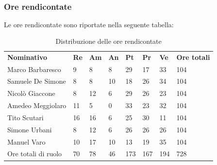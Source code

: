\subsubsection{Ore rendicontate}
Le ore rendicontate sono riportate nella seguente tabella:
\begin{center}
    \begin{table}[ht!]
        \centering
        \caption{Distribuzione delle ore rendicontate}
        \vspace{5px}
        \renewcommand{\arraystretch}{1.8}
        \begin{tabular}{p{100px} p{20px} p{20px} p{20px} p{20px} p{20px} p{20px} p{50px} }
            \rowcolor{logo!70} \textbf{Nominativo} & \textbf{Re} & \textbf{Am} & \textbf{An} & \textbf{Pt} & \textbf{Pr} & \textbf{Ve} & \textbf{Ore totali} \\
            Marco Barbaresco                       & 9           & 8           & 8           & 29          & 17          & 33          & 104                 \\
            Samuele De Simone                      & 8           & 8           & 10          & 18          & 26          & 34          & 104                 \\
            Nicolò Giaccone                        & 8           & 12          & 6           & 29          & 26          & 23          & 104                 \\
            Amedeo Meggiolaro                      & 11          & 5           & 0           & 33          & 23          & 32          & 104                 \\
            Tito Scutari                           & 16          & 16          & 6           & 25          & 30          & 11          & 104                 \\
            Simone Urbani                          & 8           & 12          & 6           & 26          & 26          & 26          & 104                 \\
            Manuel Varo                            & 10          & 17          & 10          & 13          & 19          & 35          & 104                 \\
            Ore totali di ruolo                    & 70          & 78          & 46          & 173         & 167         & 194         & 728                 \\
        \end{tabular}
    \end{table}
\end{center}
